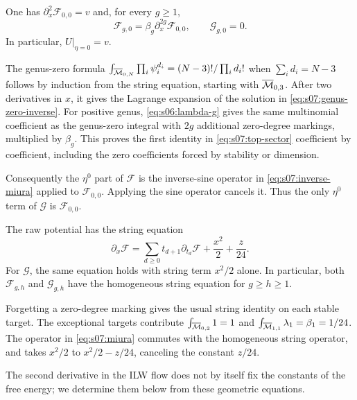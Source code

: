 \begin{lmm}\label{lmm:s07:top-sector}
One has $\partial_x^2\mathcal F_{0,0}=v$ and, for every $g\geq1$,
\begin{equation}\label{eq:s07:top-sector}
 \mathcal F_{g,0}=\beta_g\partial_x^{2g}\mathcal F_{0,0},
 \qquad \mathcal G_{g,0}=0.
\end{equation}
In particular, $U|_{\eta=0}=v$.
\end{lmm}
\begin{prf}
The genus-zero formula
$\int_{\overline{\mathcal{M}}_{0,N}}\prod_i\psi_i^{d_i}
=(N-3)!/\prod_i d_i!$ when $\sum_i d_i=N-3$ follows by induction
from the string equation, starting with $\overline{\mathcal{M}}_{0,3}$.
After two derivatives in $x$, it gives the Lagrange expansion of the
solution in \eqref{eq:s07:genus-zero-inverse}. For positive genus,
\eqref{eq:s06:lambda-g} gives the same multinomial coefficient as
the genus-zero integral with $2g$ additional zero-degree markings,
multiplied by $\beta_g$. This proves the first identity in
\eqref{eq:s07:top-sector} coefficient by coefficient, including the
zero coefficients forced by stability or dimension.

Consequently the $\eta^0$ part of $\mathcal F$ is the inverse-sine
operator in \eqref{eq:s07:inverse-miura} applied to
$\mathcal F_{0,0}$. Applying the sine operator cancels it. Thus the
only $\eta^0$ term of $\mathcal G$ is $\mathcal F_{0,0}$.
\end{prf}

\begin{lmm}\label{lmm:s07:string}
The raw potential has the string equation
\begin{equation}\label{eq:s07:string}
 \partial_x\mathcal F
 =\sum_{d\geq0}t_{d+1}\partial_{t_d}\mathcal F
                 +\frac{x^2}{2}+\frac z{24}.
\end{equation}
For $\mathcal G$, the same equation holds with string term $x^2/2$
alone. In particular, both $\mathcal F_{g,h}$ and $\mathcal G_{g,h}$
have the homogeneous string equation for $g\geq h\geq1$.
\end{lmm}
\begin{prf}
Forgetting a zero-degree marking gives the usual string
identity on each stable target. The exceptional targets contribute
$\int_{\overline{\mathcal{M}}_{0,3}}1=1$ and
$\int_{\overline{\mathcal{M}}_{1,1}}\lambda_1=\beta_1=1/24$.
The operator in \eqref{eq:s07:miura} commutes with the homogeneous
string operator, and takes $x^2/2$ to $x^2/2-z/24$, canceling the
constant $z/24$.
\end{prf}

The second derivative in the ILW flow
does not by itself fix the constants of the free energy; we determine
them below from these geometric equations.
